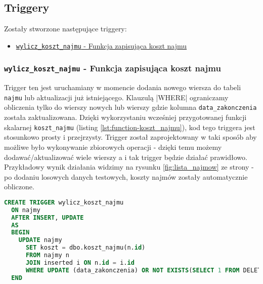 \subsection{Triggery}

Zostały stworzone następujące triggery:
\begin{itemize}
	\item \href{run:Sources/SQL/5. Triggery/018_Utworzenie_triggeru_aktualizujacego_koszt_najmu.sql}{\texttt{wylicz\_koszt\_najmu} - Funkcja zapisująca koszt najmu}
\end{itemize}

\subsubsection{\texttt{wylicz\_koszt\_najmu} - Funkcja zapisująca koszt najmu}

Trigger ten jest uruchamiany w momencie dodania nowego wiersza do tabeli \texttt{najmu} lub aktualizacji już istniejącego. Klauzulą |WHERE| ograniczamy obliczenia tylko do wierszy nowych lub wierszy gdzie kolumna \texttt{data\_zakonczenia} została zaktualizowana. Dzięki wykorzystaniu wcześniej przygotowanej funkcji skalarnej \texttt{koszt\_najmu} (listing \ref{lst:function-koszt_najmu}), kod tego triggera jest stosunkowo prosty i przejrzysty. Trigger został zaprojektowany w taki sposób aby możliwe było wykonywanie zbiorowych operacji - dzięki temu możemy dodawać/aktualizować wiele wierszy a i tak trigger będzie działać prawidłowo. Przykładowy wynik działania widzimy na rysunku \ref{fig:lista_najmow} ze strony \pageref{fig:lista_najmow} - po dodaniu losowych danych testowych, koszty najmów zostały automatycznie obliczone.

\begin{lstlisting}[language=SQL, caption={Skrypt tworzący trigger \texttt{wylicz\_koszt\_najmu}}, label={lst:trigger-wylicz_koszt_najmu}]
CREATE TRIGGER wylicz_koszt_najmu
  ON najmy
  AFTER INSERT, UPDATE
  AS
  BEGIN
    UPDATE najmy
      SET koszt = dbo.koszt_najmu(n.id)
      FROM najmy n
      JOIN inserted i ON n.id = i.id
      WHERE UPDATE (data_zakonczenia) OR NOT EXISTS(SELECT 1 FROM DELETED)
  END
\end{lstlisting}